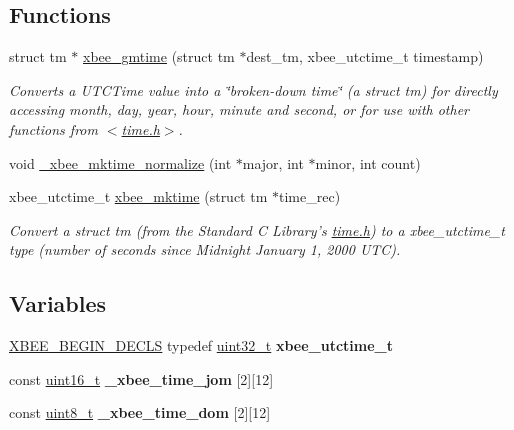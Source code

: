 \subsection*{Functions}
\begin{DoxyCompactItemize}
\item 
struct tm $\ast$ \hyperlink{group__xbee__time_ga82532f78c0106d9d57ccc370781f1c0a}{xbee\-\_\-gmtime} (struct tm $\ast$dest\-\_\-tm, xbee\-\_\-utctime\-\_\-t timestamp)
\begin{DoxyCompactList}\small\item\em Converts a U\-T\-C\-Time value into a \char`\"{}broken-\/down time\char`\"{} (a struct tm) for directly accessing month, day, year, hour, minute and second, or for use with other functions from $<$\hyperlink{time_8h}{time.\-h}$>$. \end{DoxyCompactList}\item 
void \hyperlink{group__xbee__time_gab8e5ed3b6996c7110d8f1698ea1cff62}{\-\_\-xbee\-\_\-mktime\-\_\-normalize} (int $\ast$major, int $\ast$minor, int count)
\item 
xbee\-\_\-utctime\-\_\-t \hyperlink{group__xbee__time_gaed48be3b2d3a20dcd32ea14b52eb4e60}{xbee\-\_\-mktime} (struct tm $\ast$time\-\_\-rec)
\begin{DoxyCompactList}\small\item\em Convert a struct tm (from the Standard C Library's {\ttfamily \hyperlink{time_8h}{time.\-h}}) to a xbee\-\_\-utctime\-\_\-t type (number of seconds since Midnight January 1, 2000 U\-T\-C). \end{DoxyCompactList}\end{DoxyCompactItemize}
\subsection*{Variables}
\begin{DoxyCompactItemize}
\item 
\hypertarget{group__xbee__time_ga5b559cd0f08a9ef0c00524862093c46f}{\hyperlink{group__hal_ga336bff4f4a6012aacc4468132bbd3d7f}{X\-B\-E\-E\-\_\-\-B\-E\-G\-I\-N\-\_\-\-D\-E\-C\-L\-S} typedef \hyperlink{group__hal__dos_ga09a1e304d66d35dd47daffee9731edaa}{uint32\-\_\-t} {\bfseries xbee\-\_\-utctime\-\_\-t}}\label{group__xbee__time_ga5b559cd0f08a9ef0c00524862093c46f}

\item 
const \hyperlink{group__hal_ga5a8b2dc9e45a9ee81a94ef304fb62505}{uint16\-\_\-t} {\bfseries \-\_\-xbee\-\_\-time\-\_\-jom} \mbox{[}2\mbox{]}\mbox{[}12\mbox{]}
\item 
const \hyperlink{group__hal_gae1affc9ca37cfb624959c866a73f83c2}{uint8\-\_\-t} {\bfseries \-\_\-xbee\-\_\-time\-\_\-dom} \mbox{[}2\mbox{]}\mbox{[}12\mbox{]}
\end{DoxyCompactItemize}



